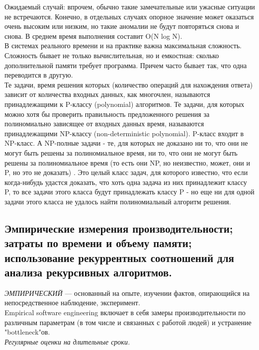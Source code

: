 \documentclass[12pt, a4paper]{article}
\begin{document}
Ожидаемый случай: впрочем, обычно такие замечательные или ужасные ситуации не встречаются. Конечно, в отдельных случаях опорное значение может
оказаться очень высоким или низким, но такие аномалии не будут повторяться
снова и снова. В среднем время выполнения составит O(N log N).\\

В системах реального времени и на практике важна максимальная сложность.\\

Сложность бывает не только вычислительная, но и емкостная: сколько дополнительной памяти требует программа. Причем часто бывает так, что одна переводится в другую.\\

Те задачи, время решения которых (количество операций для нахождения ответа) зависит от количества входных данных, как многочлен, называются принадлежащими к P-классу (polynomial) алгоритмов. Те задачи, для которых можно хотя бы проверить правильность предложенного решения за полиномиально зависящее от входных данных время, называются принадлежащими NP-классу (non-deterministic polynomial). P-класс входит в NP-класс. А NP-полные задачи - те, для которых не доказано ни то, что они не могут быть решены за полиномиальное время, ни то, что они не могут быть решены за полиномиальное время (то есть они NP, но неизвестно, может, они и P, но это не доказать) . Это целый класс задач, для которого известно, что если когда-нибудь удастся доказать, что хоть одна задача из них принадлежит классу P, то все задачи этого класса будут принадлежать классу P - но еще ни для одной задачи этого класса не удалось найти полиномиальный алгоритм решения.

\subsection{Эмпирические измерения производительности; затраты по времени и объему памяти; использование рекуррентных соотношений для анализа рекурсивных алгоритмов.}

\textit{ЭМПИРИЧЕСКИЙ} --- основанный на опыте, изучении фактов, опирающийся на непосредственное наблюдение, эксперимент.\\

Empirical software engineering включает в себя замеры производительности по различным параметрам (в том числе и связанных с работой людей) и устранение "bottleneck"{}ов.\\

\textit{Регулярные оценки на длительные сроки.}\\
\end{document}
